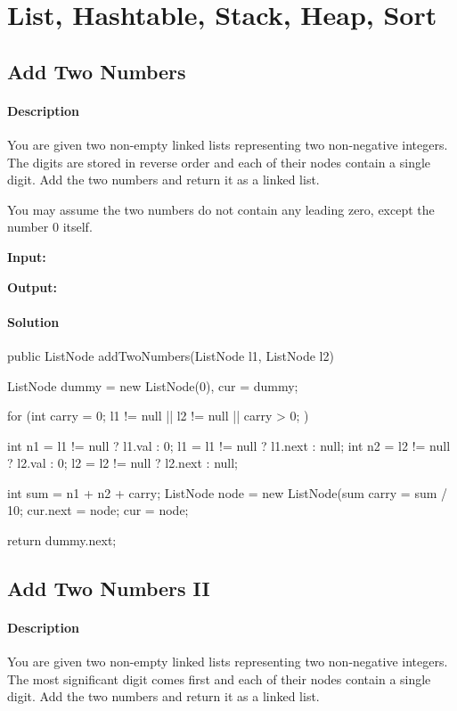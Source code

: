 \chapter{List, Hashtable, Stack, Heap, Sort}

\section{Add Two Numbers} %

\subsubsection{Description}
You are given two non-empty linked lists representing two non-negative integers. The digits are stored in reverse order and each of their nodes contain a single digit. Add the two numbers and return it as a linked list.

You may assume the two numbers do not contain any leading zero, except the number 0 itself.

\textbf{Input:} 

\textbf{Output:} 

\subsubsection{Solution}

\begin{Code}
public ListNode addTwoNumbers(ListNode l1, ListNode l2) {
    ListNode dummy = new ListNode(0), cur = dummy;

    for (int carry = 0; l1 != null || l2 != null || carry > 0; ) {
        int n1 = l1 != null ? l1.val : 0;
        l1 = l1 != null ? l1.next : null;
        int n2 = l2 != null ? l2.val : 0;
        l2 = l2 != null ? l2.next : null;

        int sum = n1 + n2 + carry;
        ListNode node = new ListNode(sum %
        carry = sum / 10;
        cur.next = node;
        cur = node;
    }

    return dummy.next;
}
\end{Code}

\newpage

\section{Add Two Numbers II} %

\subsubsection{Description}
You are given two non-empty linked lists representing two non-negative integers. The most significant digit comes first and each of their nodes contain a single digit. Add the two numbers and return it as a linked list.


